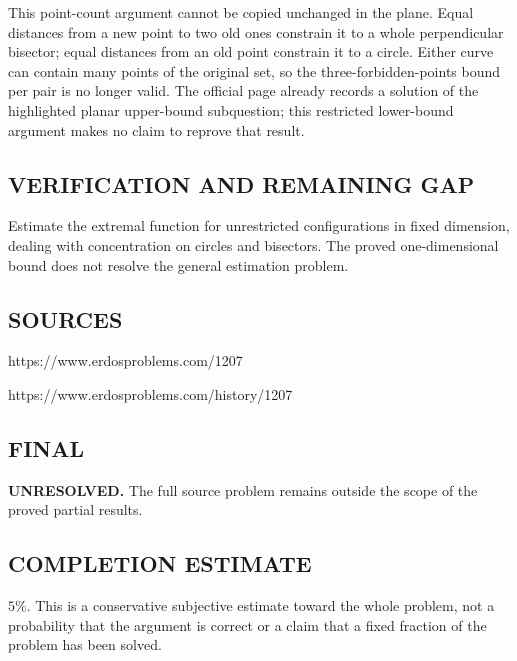 This point-count argument cannot be copied unchanged in the plane. Equal
distances from a new point to two old ones constrain it to a whole perpendicular
bisector; equal distances from an old point constrain it to a circle. Either
curve can contain many points of the original set, so the three-forbidden-points
bound per pair is no longer valid. The official page already records a solution
of the highlighted planar upper-bound subquestion; this restricted lower-bound
argument makes no claim to reprove that result.

\subsection*{VERIFICATION AND REMAINING GAP}
Estimate the extremal function for unrestricted configurations in fixed
dimension, dealing with concentration on circles and bisectors. The proved
one-dimensional bound does not resolve the general estimation problem.

\subsection*{SOURCES}
https://www.erdosproblems.com/1207

https://www.erdosproblems.com/history/1207

\subsection*{FINAL}
\textbf{UNRESOLVED.} The full source problem remains outside the scope of the proved partial results.

\subsection*{COMPLETION ESTIMATE}
$5\%$. This is a conservative subjective estimate toward the whole problem, not a probability that the argument is correct or a claim that a fixed fraction of the problem has been solved.
